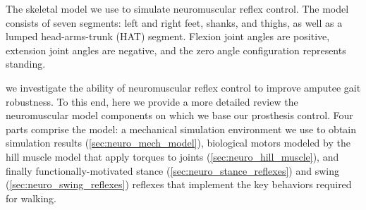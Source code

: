 \begin{marginfigure}
    \caption[The skeletal model we use to simulate neuromuscular reflex
    control]{The skeletal model we use to simulate neuromuscular reflex control.
    The model consists of seven segments: left and right feet, shanks, and
    thighs, as well as a lumped head-arms-trunk (HAT) segment. Flexion joint
    angles are positive, extension joint angles are negative, and the zero angle
    configuration represents standing.}
    \label{fig:neuro_seven_link}
\end{marginfigure}

 we investigate the ability of
neuromuscular reflex control to improve amputee gait robustness. To this end,
here we provide a more detailed review the neuromuscular model components on
which we base our prosthesis control. Four parts comprise the model: a
mechanical simulation environment we use to obtain simulation results
(\cref{sec:neuro_mech_model}), biological motors modeled by the hill muscle
model that apply torques to joints (\cref{sec:neuro_hill_muscle}), and finally
functionally-motivated stance (\cref{sec:neuro_stance_reflexes}) and swing
(\cref{sec:neuro_swing_reflexes}) reflexes that implement the key behaviors
required for walking.





